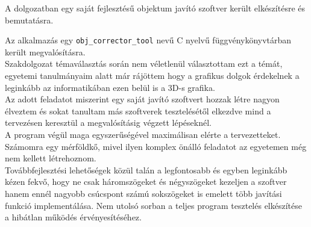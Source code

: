 A dolgozatban egy saját fejlesztésű objektum javító szoftver került elkészítésre és bemutatásra.

Az alkalmazás egy \texttt{obj\_corrector\_tool} nevű C nyelvű függvénykönyvtárban került megvalósításra.\\

Szakdolgozat témaválasztás során nem véletlenül választottam ezt a témát, egyetemi tanulmányaim alatt már rájöttem hogy a grafikus dolgok érdekelnek a leginkább az informatikában ezen belül is a 3D-s grafika.\\

Az adott feladatot miszerint egy saját javító szoftvert hozzak létre nagyon élveztem és sokat tanultam más szoftverek tesztelésétől elkezdve mind a tervezésen keresztül a megvalósításig végzett lépéseknél.\\

A program végül maga egyszerűségével maximálisan elérte a tervezetteket. Számomra egy mérföldkő, mivel ilyen komplex önálló feladatot az egyetemen még nem kellett létrehoznom.\\

Továbbfejlesztési lehetőségek közül talán a legfontosabb és egyben leginkább kézen fekvő, hogy ne csak háromszögeket és négyszögeket kezeljen a szoftver hanem ennél nagyobb csúcspont számú sokszögeket is emelett több javítási funkció implementálása. Nem utolsó sorban a teljes program tesztelés elkészítése a hibátlan működés érvényesítéséhez.